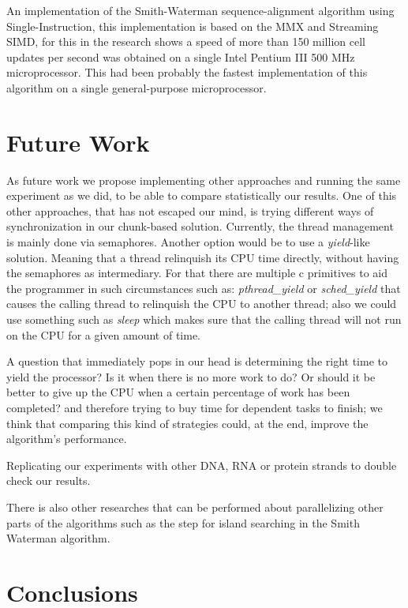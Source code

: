 \documentclass[journal]{IEEEtran}
\begin{document}
An implementation of the Smith-Waterman sequence-alignment algorithm using Single-Instruction, this implementation is based on the MMX and Streaming SIMD, for this in \cite{rognes2000six} the research shows a speed of more than 150 million cell updates per second was obtained on a single Intel Pentium III 500 MHz microprocessor. This had been probably the fastest implementation of this algorithm on a single general-purpose microprocessor. 


\section{Future Work}

As future work we propose implementing other approaches and running the same experiment as we did, to be able to compare statistically our results. One of this other approaches, that has not escaped our mind, is trying different ways of synchronization in our chunk-based solution. Currently, the thread management is mainly done via semaphores. Another option would be to use a \textit{yield}-like solution. Meaning that a thread relinquish its CPU time directly, without having the semaphores as intermediary. For that there are multiple c primitives to aid the programmer in such circumstances such as: \textit{pthread\_yield} or \textit{sched\_yield} that causes the calling thread to relinquish the CPU to another thread; also we could use something such as \textit{sleep} which makes sure that the calling thread will not run on the CPU for a given amount of time. 

A question that immediately pops in our head is determining the right time to yield the processor? Is it when there is no more work to do? Or should it be better to give up the CPU when a certain percentage of work has been completed? and therefore trying to buy time for dependent tasks to finish; we think that comparing this kind of strategies could, at the end, improve the algorithm's performance. 

Replicating our experiments with other DNA, RNA or protein strands to double check our results. 

There is also other researches that can be performed about parallelizing other parts of the algorithms such as the step for island searching in the Smith Waterman algorithm.


\section{Conclusions}
\end{document}
